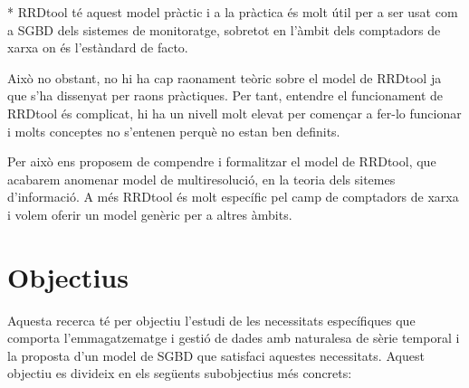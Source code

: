 * RRDtool té aquest model pràctic i a la pràctica és molt útil per a ser usat com a SGBD dels sistemes de monitoratge, sobretot en l'àmbit dels comptadors de xarxa on és l'estàndard de facto. 

Això no obstant, no hi ha cap raonament teòric sobre el model de RRDtool ja que s'ha dissenyat per raons pràctiques. Per tant, entendre el funcionament de RRDtool és complicat, hi ha un nivell molt elevat per començar a fer-lo funcionar i molts conceptes no s'entenen perquè no estan ben definits. 

Per això ens proposem de compendre i formalitzar el model de RRDtool, que acabarem anomenar model de multiresolució, en la teoria dels sitemes d'informació. A més RRDtool és molt específic pel camp de comptadors de xarxa i volem oferir un model genèric per a altres àmbits.  













\section{Objectius}



Aquesta recerca té per objectiu l'estudi de les necessitats
específiques que comporta l'emmagatzematge i gestió de dades amb
naturalesa de sèrie temporal i la proposta d'un model de SGBD que
satisfaci aquestes necessitats. Aquest objectiu es divideix en els
següents subobjectius més concrets:

